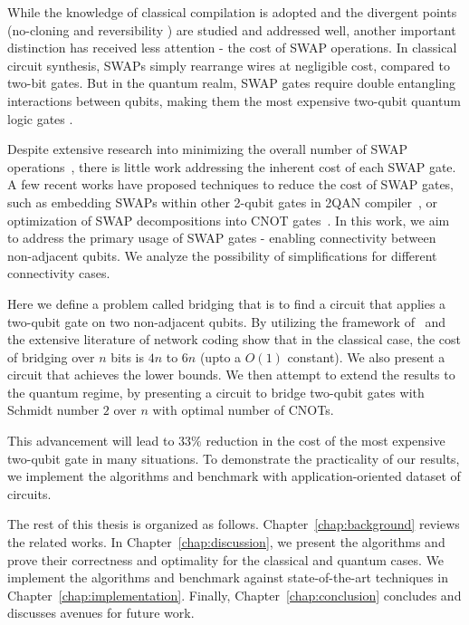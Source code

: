 \documentclass{report}
\begin{document}
While the knowledge of classical compilation is adopted and the divergent points (no-cloning \cite{TODO} and reversibility \cite{TODO}) are studied and addressed well, another important distinction has received less attention - the cost of SWAP operations. In classical circuit synthesis, SWAPs simply rearrange wires at negligible cost, compared to two-bit gates. But in the quantum realm, SWAP gates require double entangling \cite{TODO} interactions between qubits, making them the most expensive two-qubit quantum logic gates \cite{TODO}.

Despite extensive research into minimizing the overall number of SWAP operations~\cite{childs, TODO}, there is little work addressing the inherent cost of each SWAP gate. A few recent works have proposed techniques to reduce the cost of SWAP gates, such as embedding SWAPs within other 2-qubit gates in 2QAN compiler~\cite{lao2021}, or optimization of SWAP decompositions into CNOT gates~\cite{kissinger2019,nash2020}. In this work, we aim to address the primary usage of SWAP gates - enabling connectivity between non-adjacent qubits. We analyze the possibility of simplifications for different connectivity cases.

Here we define a problem called bridging that is to find a circuit that applies a two-qubit gate on two non-adjacent qubits. By utilizing the framework of~\cite{kissinger2019} and the extensive literature of network coding \cite{TODO} show that in the classical case, the cost of bridging over $n$ bits is $4n$ to $6n$ (upto a $O(1)$ constant). We also present a circuit that achieves the lower bounds. We then attempt to extend the results to the quantum regime, by presenting a circuit to bridge two-qubit gates with Schmidt number $2$ over $n$ with optimal number of CNOTs.

This advancement will lead to $33\%$ reduction in the cost of the most expensive two-qubit gate in many situations. To demonstrate the practicality of our results, we implement the algorithms and benchmark with application-oriented dataset of circuits.

The rest of this thesis is organized as follows. Chapter~\ref{chap:background} reviews the related works. In Chapter~\ref{chap:discussion}, we present the algorithms and prove their correctness and optimality for the classical and quantum cases. We implement the algorithms and benchmark against state-of-the-art techniques in Chapter~\ref{chap:implementation}. Finally, Chapter~\ref{chap:conclusion} concludes and discusses avenues for future work.
\end{document}
